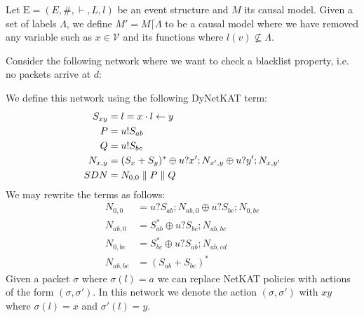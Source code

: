 \begin{definition}
    Let $\mathrm{E} = (E,\#,\vdash,L,l)$ be an event structure and $M$ its
    causal model.
    Given a set of labels $\Lambda$, we define $M' = M\lceil \Lambda$ to be
    a causal model where we have removed any variable such as
    $x \in \mathcal{V}$ and its functions where $l(v) \not \subseteq \Lambda$.
\end{definition}

\begin{example}
    Consider the following network where we want to check a blacklist
    property, i.e. no packets arrive at $d$:
    \begin{center}
    \end{center}
    We define this network using the following DyNetKAT term:
    \begin{align*}
        S_{xy}  & = l = x \cdot l \leftarrow y              \\
        P       & = u!S_{ab}                         \\
        Q       & = u!S_{bc}                         \\
        N_{x,y} & = (S_x+S_y)^* \oplus u?x';N_{x',y}
        \oplus u?y';N_{x,y'}                         \\
        SDN     & = N_{0,0} \parallel P \parallel Q
    \end{align*}
    We may rewrite the terms as follows:
    \begin{align*}
        N_{0,0}   & = u?S_{ab};N_{ab,0} \oplus u?S_{bc};N_{0,bc} \\
        N_{ab,0}  & = S_{ab}^* \oplus u?S_{bc};N_{ab,bc}         \\
        N_{0,bc}  & = S_{bc}^* \oplus u?S_{ab};N_{ab,cd}         \\
        N_{ab,bc} & = (S_{ab}+S_{bc})^*
    \end{align*}
    Given a packet $\sigma$ where $\sigma(l) = a$ we can replace NetKAT
    policies with actions of the form $(\sigma, \sigma')$.
    In this network we denote the action $(\sigma, \sigma')$
    with $xy$ where $\sigma(l) = x$ and $\sigma'(l) = y$.

\end{example}
